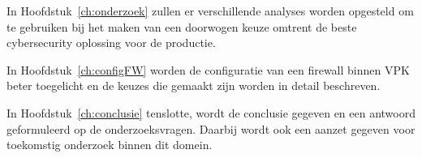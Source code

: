 In Hoofdstuk~\ref{ch:onderzoek} zullen er verschillende analyses worden opgesteld om te gebruiken bij het maken van een doorwogen keuze omtrent de beste cybersecurity oplossing voor de productie.

In Hoofdstuk~\ref{ch:configFW} worden de configuratie van een firewall binnen VPK beter toegelicht en de keuzes die gemaakt zijn worden in detail beschreven.

In Hoofdstuk~\ref{ch:conclusie} tenslotte, wordt de conclusie gegeven en een antwoord geformuleerd op de onderzoeksvragen. Daarbij wordt ook een aanzet gegeven voor toekomstig onderzoek binnen dit domein.
